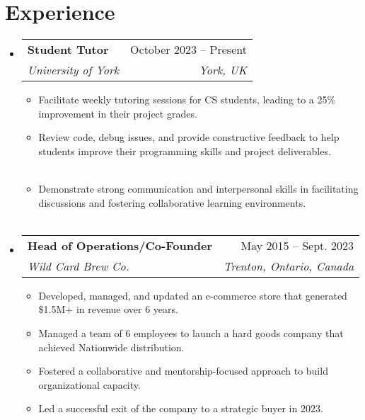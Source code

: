 \documentclass[letterpaper,11pt]{article}
\makeatletter
\newcommand{\resumeItem}[1]{
  \item\small{
    {#1 \vspace{-2pt}}
  }
}
\newcommand{\resumeSubheading}[4]{
  \vspace{-2pt}\item
    \begin{tabular*}{0.97\textwidth}[t]{l@{\extracolsep{\fill}}r}
      \textbf{#1} & #2 \\
      \textit{\small#3} & \textit{\small #4} \\
    \end{tabular*}\vspace{-7pt}
}
\newcommand{\resumeSubSubheading}[2]{
    \item
    \begin{tabular*}{0.97\textwidth}{l@{\extracolsep{\fill}}r}
      \textit{\small#1} & \textit{\small #2} \\
    \end{tabular*}\vspace{-7pt}
}
\newcommand{\resumeSubHeadingListStart}{\begin{itemize}[leftmargin=0.15in, label={}]}
\newcommand{\resumeSubHeadingListEnd}{\end{itemize}}
\newcommand{\resumeItemListStart}{\begin{itemize}}
\newcommand{\resumeItemListEnd}{\end{itemize}\vspace{-5pt}}
\makeatother
\begin{document}

\section{Experience}
  \resumeSubHeadingListStart

    \resumeSubheading
      {Student Tutor}{October 2023 -- Present}
      {University of York}{York, UK}
      \resumeItemListStart
      \resumeItem{Facilitate weekly tutoring sessions for CS students, leading to a 25\% improvement in their project grades.}
      \resumeItem{Review code, debug issues, and provide constructive feedback to help students improve their programming skills and project deliverables.
      \small{
    \textcolor{white}{back-end full-stack  Web Development node js
      }\\
      }}
      \resumeItem{Demonstrate strong communication and interpersonal skills in facilitating discussions and fostering collaborative learning environments.
          \small{
        \textcolor{white}{Software Testing database design API testing SDLC full stack tdd Wepack pytorch
          }\\
          }}
    \resumeItemListEnd
      

    \resumeSubheading
      {Head of Operations/Co-Founder}{May 2015 -- Sept. 2023}
      {Wild Card Brew Co.}{Trenton, Ontario, Canada}
      \resumeItemListStart
      \resumeItem{Developed, managed, and updated an e-commerce store that generated \$1.5M+ in revenue over 6 years.}
      \resumeItem{Managed a team of 6 employees to launch a hard goods company that achieved Nationwide distribution.}
      \resumeItem{Fostered a collaborative and mentorship-focused approach to build organizational capacity.}
      \resumeItem{Led a successful exit of the company to a strategic buyer in 2023.}
      \resumeItemListEnd
      
      \resumeSubHeadingListEnd

%
\end{document}
